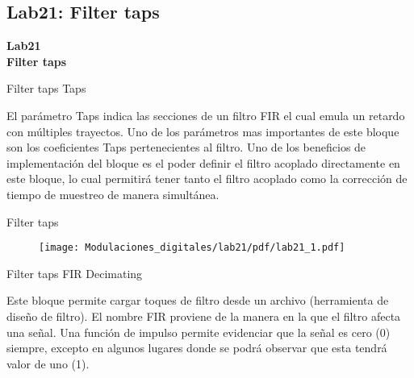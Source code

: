 \subsection{Lab21: Filter taps}

\begin{frame}{}


\bfseries{\textrm{\LARGE Lab21\\ \Large Filter taps}}
\raggedright
\end{frame}


\begin{frame}{Filter taps}
Taps
\begin{flushleft}
El parámetro Taps indica las secciones de un filtro FIR el cual emula un retardo con múltiples trayectos. Uno de los parámetros mas importantes de este bloque son los coeficientes Taps pertenecientes al filtro. Uno de los beneficios de implementación del bloque es el poder definir el filtro acoplado directamente en este bloque, lo cual permitirá tener tanto el filtro acoplado como la corrección de tiempo de muestreo de manera simultánea. 
\end{flushleft}
\end{frame}


\begin{frame}{Filter taps}
\begin{figure}[H]
\centering
\texttt{[image: Modulaciones\_digitales/lab21/pdf/lab21\_1.pdf]}
\end{figure}
\end{frame}

\begin{frame}{Filter taps}
FIR Decimating
\begin{flushleft}
Este bloque permite cargar toques de filtro desde un archivo (herramienta de diseño de filtro). El nombre FIR proviene de la manera en la que el filtro afecta una señal.
Una función de impulso permite evidenciar que la señal es cero (0) siempre, excepto en algunos lugares donde se podrá observar que esta tendrá valor de uno (1). 
\end{flushleft}
\end{frame}


